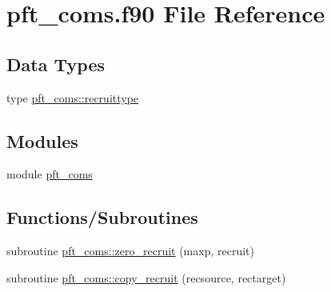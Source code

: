 \hypertarget{pft__coms_8f90}{}\section{pft\+\_\+coms.\+f90 File Reference}
\label{pft__coms_8f90}
\subsection*{Data Types}
\begin{DoxyCompactItemize}
\item 
type \hyperlink{structpft__coms_1_1recruittype}{pft\+\_\+coms\+::recruittype}
\end{DoxyCompactItemize}
\subsection*{Modules}
\begin{DoxyCompactItemize}
\item 
module \hyperlink{namespacepft__coms}{pft\+\_\+coms}
\end{DoxyCompactItemize}
\subsection*{Functions/\+Subroutines}
\begin{DoxyCompactItemize}
\item 
subroutine \hyperlink{namespacepft__coms_ab4e136720b91ff7a1087e0f0163dfacd}{pft\+\_\+coms\+::zero\+\_\+recruit} (maxp, recruit)
\item 
subroutine \hyperlink{namespacepft__coms_a7d92f11102baa7fd26b952a5c9ea83fc}{pft\+\_\+coms\+::copy\+\_\+recruit} (recsource, rectarget)
\end{DoxyCompactItemize}
